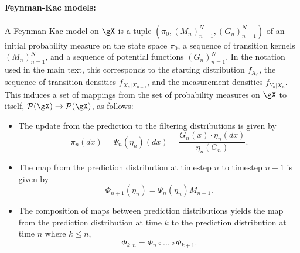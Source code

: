 \paragraph{\bf Feynman-Kac models:} A Feynman-Kac model on $\gX$ is a tuple $(\pi_0, (M_n)_{n=1}^N, (G_n)_{n=1}^N)$ of an initial probability measure on the state space $\pi_0$, a sequence of transition kernels $(M_n)_{n=1}^N$, and a sequence of potential functions $(G_n)_{n=1}^N$. In the notation used in the main text, this corresponds to the starting distribution $f_{X_0}$, the sequence of transition densities $f_{X_{n}|X_{n-1}}$, and the measurement densities $f_{Y_n|X_n}$. This induces a set of mappings from the set of probability measures on $\gX$ to itself, $\mathcal{P}(\gX) \to \mathcal{P}(\gX)$, as follows:
\begin{itemize}
    \item The update from the prediction to the filtering distributions is given by 
    \begin{equation}
    \pi_n(dx) = \Psi_n(\eta_n)(dx) = \frac{G_n(x)\cdot\eta_n(dx)}{\eta_n(G_n)}.
    \end{equation}
    \item The map from the prediction distribution at timestep $n$ to timestep $n+1$ is given by 
    \begin{equation}
 \Phi_{n+1}(\eta_n) = \Psi_n(\eta_n) M_{n+1}.       
    \end{equation}
    \item The composition of maps between prediction distributions yields the map from the prediction distribution at time $k$ to the prediction distribution at time $n$ where $k \leq n$,
    \begin{equation}
 \Phi_{k,n} = \Phi_n \circ ... \circ \Phi_{k+1}.       
    \end{equation}
\end{itemize}
